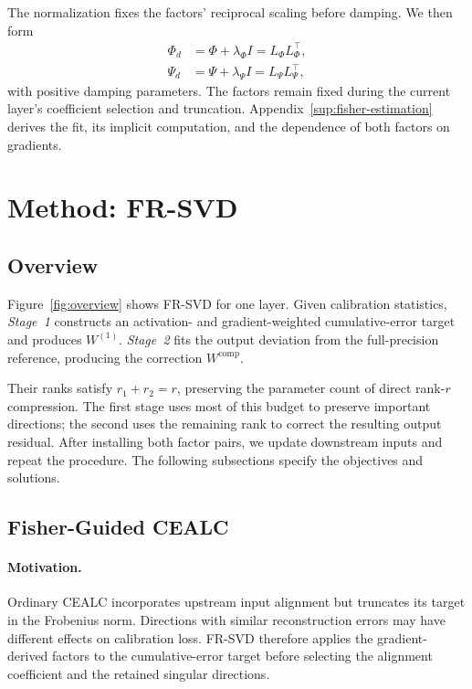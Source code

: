 \documentclass[11pt]{article}
\begin{document}
The normalization fixes the factors' reciprocal scaling before damping. We then form
\begin{equation}
\begin{aligned}
\Phi_d&=\Phi+\lambda_\Phi I=L_\Phi L_\Phi^\top,\\
\Psi_d&=\Psi+\lambda_\Psi I=L_\Psi L_\Psi^\top,
\end{aligned}
\label{eq:fisher-cholesky}
\end{equation}
with positive damping parameters. The factors remain fixed during the current layer's coefficient selection and truncation. Appendix~\ref{sup:fisher-estimation} derives the fit, its implicit computation, and the dependence of both factors on gradients.

\section{Method: FR-SVD}\label{sec:method}

\subsection{Overview}\label{sec:overview}

Figure~\ref{fig:overview} shows FR-SVD for one layer. Given calibration statistics, \emph{Stage~1} constructs an activation- and gradient-weighted cumulative-error target and produces $W^{(1)}$. \emph{Stage~2} fits the output deviation from the full-precision reference, producing the correction $W^{\mathrm{comp}}$.



Their ranks satisfy $r_1+r_2=r$, preserving the parameter count of direct rank-$r$ compression. The first stage uses most of this budget to preserve important directions; the second uses the remaining rank to correct the resulting output residual. After installing both factor pairs, we update downstream inputs and repeat the procedure. The following subsections specify the objectives and solutions.

\subsection{Fisher-Guided CEALC}\label{sec:fisher-cealc}

\paragraph{Motivation.}
Ordinary CEALC incorporates upstream input alignment but truncates its target in the Frobenius norm. Directions with similar reconstruction errors may have different effects on calibration loss. FR-SVD therefore applies the gradient-derived factors to the cumulative-error target before selecting the alignment coefficient and the retained singular directions.
\end{document}
